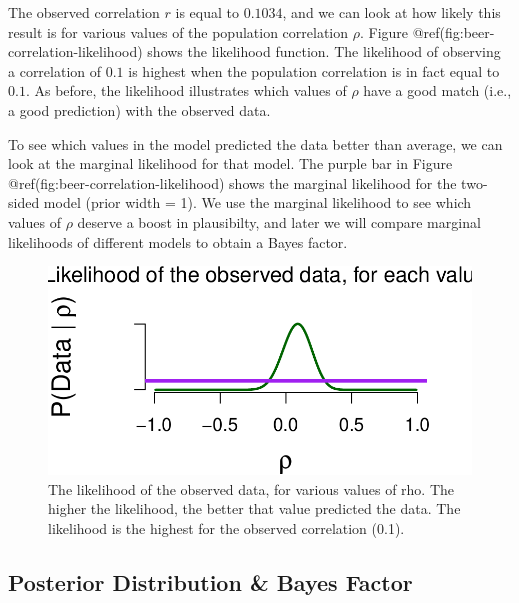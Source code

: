 \documentclass[
  letterpaper,
  DIV=11,
  numbers=noendperiod]{scrreprt}
\begin{document}
The observed correlation \(r\) is equal to \(0.1034\), and we can look
at how likely this result is for various values of the population
correlation \(\rho\). Figure @ref(fig:beer-correlation-likelihood) shows
the likelihood function. The likelihood of observing a correlation of
\(0.1\) is highest when the population correlation is in fact equal to
\(0.1\). As before, the likelihood illustrates which values of \(\rho\)
have a good match (i.e., a good prediction) with the observed data.

To see which values in the model predicted the data better than average,
we can look at the marginal likelihood for that model. The purple bar in
Figure @ref(fig:beer-correlation-likelihood) shows the marginal
likelihood for the two-sided model (prior width = 1). We use the
marginal likelihood to see which values of \(\rho\) deserve a boost in
plausibilty, and later we will compare marginal likelihoods of different
models to obtain a Bayes factor.

\begin{figure}

{\centering \includegraphics[width=1\textwidth,height=\textheight]{05-more-tests_files/figure-pdf/beer-correlation-likelihood-1.pdf}

}

\caption{The likelihood of the observed data, for various values of rho.
The higher the likelihood, the better that value predicted the data. The
likelihood is the highest for the observed correlation (0.1).}

\end{figure}

\hypertarget{posterior-distribution-bayes-factor-1}{%
\subsection{Posterior Distribution \& Bayes
Factor}\label{posterior-distribution-bayes-factor-1}}
\end{document}

